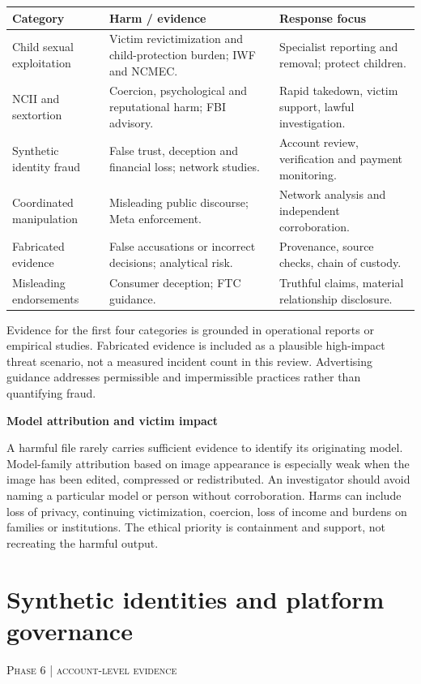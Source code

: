 \documentclass[11pt,a4paper]{article}
\newcommand{\sect}[2]{\section{#1}\textcolor{muted}{\small\textsc{#2}}\par\vspace{2mm}}
\newcommand{\sub}[1]{\vspace{1mm}\textbf{#1}\par}
\begin{document}
\begin{center}\small\begin{tabularx}{\linewidth}{@{}YYY@{}}\toprule
\textbf{Category} & \textbf{Harm / evidence} & \textbf{Response focus}\\\midrule
Child sexual exploitation & Victim revictimization and child-protection burden; IWF and NCMEC. & Specialist reporting and removal; protect children.\\
NCII and sextortion & Coercion, psychological and reputational harm; FBI advisory. & Rapid takedown, victim support, lawful investigation.\\
Synthetic identity fraud & False trust, deception and financial loss; network studies. & Account review, verification and payment monitoring.\\
Coordinated manipulation & Misleading public discourse; Meta enforcement. & Network analysis and independent corroboration.\\
Fabricated evidence & False accusations or incorrect decisions; analytical risk. & Provenance, source checks, chain of custody.\\
Misleading endorsements & Consumer deception; FTC guidance. & Truthful claims, material relationship disclosure.\\\bottomrule\end{tabularx}\end{center}

Evidence for the first four categories is grounded in operational reports or empirical studies. Fabricated evidence is included as a plausible high-impact threat scenario, not a measured incident count in this review. Advertising guidance addresses permissible and impermissible practices rather than quantifying fraud. \cite{iwf,ncmec25,fbi,meta,fakefaces,ftcads}


\sub{Model attribution and victim impact}

A harmful file rarely carries sufficient evidence to identify its originating model. Model-family attribution based on image appearance is especially weak when the image has been edited, compressed or redistributed. An investigator should avoid naming a particular model or person without corroboration. Harms can include loss of privacy, continuing victimization, coercion, loss of income and burdens on families or institutions. The ethical priority is containment and support, not recreating the harmful output.


\clearpage\sect{Synthetic identities and platform governance}{Phase 6 | account-level evidence}
\end{document}
